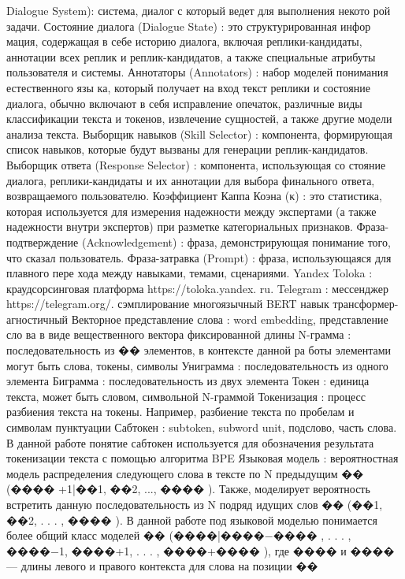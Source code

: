 Dialogue System): система, диалог с который ведет для выполнения некото
рой задачи.
Состояние диалога (Dialogue State) : это структурированная инфор
мация, содержащая в себе историю диалога, включая реплики-кандидаты,
аннотации всех реплик и реплик-кандидатов, а также специальные атрибуты
пользователя и системы.
Аннотаторы (Annotators) : набор моделей понимания естественного язы
ка, который получает на вход текст реплики и состояние диалога, обычно
включают в себя исправление опечаток, различные виды классификации текста
и токенов, извлечение сущностей, а также другие модели анализа текста.
Выборщик навыков (Skill Selector) : компонента, формирующая список
навыков, которые будут вызваны для генерации реплик-кандидатов.
Выборщик ответа (Response Selector) : компонента, использующая со
стояние диалога, реплики-кандидаты и их аннотации для выбора финального
ответа, возвращаемого пользователю.
Коэффициент Каппа Коэна (κ) : это статистика, которая используется
для измерения надежности между экспертами (а также надежности внутри
экспертов) при разметке категориальных признаков.
Фраза-подтверждение (Acknowledgement) : фраза, демонстрирующая
понимание того, что сказал пользователь.
Фраза-затравка (Prompt) : фраза, использующаяся для плавного пере
хода между навыками, темами, сценариями.
Yandex Toloka : краудсорсинговая платформа https://toloka.yandex.
ru.
Telegram : мессенджер https://telegram.org/.
сэмплирование
многоязычный
BERT
навык
трансформер-агностичный
Векторное представление слова : word embedding, представление сло
ва в виде вещественного вектора фиксированной длины
N-грамма : последовательность из �� элементов, в контексте данной ра
боты элементами могут быть слова, токены, символы
Униграмма : последовательность из одного элемента
Биграмма : последовательность из двух элемента
Токен : единица текста, может быть словом, символьной N-граммой
Токенизация : процесс разбиения текста на токены. Например, разбиение
текста по пробелам и символам пунктуации
Сабтокен : subtoken, subword unit, подслово, часть слова. В данной работе
понятие сабтокен используется для обозначения результата токенизации текста
с помощью алгоритма BPE
Языковая модель : вероятностная модель распределения следующего
слова в тексте по N предыдущим �� (���� +1|��1, ��2, ..., ���� ). Также, моделирует
вероятность встретить данную последовательность из N подряд идущих слов
�� (��1, ��2, . . . , ���� ). В данной работе под языковой моделью понимается более
общий класс моделей �� (����|����−���� , . . . , ����−1, ����+1, . . . , ����+���� ), где ���� и ���� — длины
левого и правого контекста для слова на позиции ��

